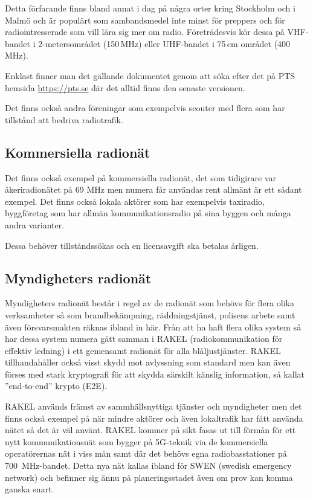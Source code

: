 Detta förfarande finns bland annat i dag på några orter kring Stockholm och i
Malmö och är populärt som sambandsmedel inte minst för preppers och för
radiointresserade som vill lära sig mer om radio. Företrädesvis kör dessa på
VHF-bandet i 2-metersområdet (150\,MHz) eller UHF-bandet i 75\,cm området
(400\,MHz).

Enklast finner man det gällande dokumentet genom att söka efter det på PTS
hemsida \url{https://pts.se} där det alltid finns den senaste versionen.

Det finns också andra föreningar som exempelvis scouter med flera som har
tillstånd att bedriva radiotrafik.

\subsection{Kommersiella radionät}

Det finns också exempel på kommersiella radionät, det som tidigirare var
åkeriradionätet på 69 MHz men numera får användas rent allmänt är ett sådant
exempel. Det finns också lokala aktörer som har exempelvis taxiradio,
byggföretag som har allmän kommunikationsradio på sina byggen och många andra
varianter.

Dessa behöver tillståndssökas och en licensavgift ska betalas årligen. 

\subsection{Myndigheters radionät}

Myndigheters radionät består i regel av de radionät som behövs för flera olika
verksamheter så som brandbekämpning, räddningstjänst, polisens arbete samt även
försvarsmakten räknas ibland in här. Från att ha haft flera olika system så har
dessa system numera gått samman i RAKEL (radiokommunikation för effektiv
ledning) i ett gemensamt radionät för alla blåljustjänster. RAKEL
tillhandahåller också visst skydd mot avlyssning som standard men kan även
förses med stark kryptografi för att skydda särskilt känslig information, så
kallat ''end-to-end'' krypto (E2E).

RAKEL används främst av sammhällsnyttiga tjänster och myndigheter men det finns
också exempel på när mindre aktörer och även lokaltrafik har fått använda nätet
så det är väl använt. RAKEL kommer på sikt fasas ut till förmån för ett nytt
kommunikationsnät som bygger på 5G-teknik via de kommersiella operatörernas nät
i viss mån samt där det behövs egna radiobasstationer på 700~MHz-bandet. Detta
nya nät kallas ibland för SWEN (swedish emergency network) och befinner sig ännu
på planeringsstadet även om prov kan komma ganska snart.

